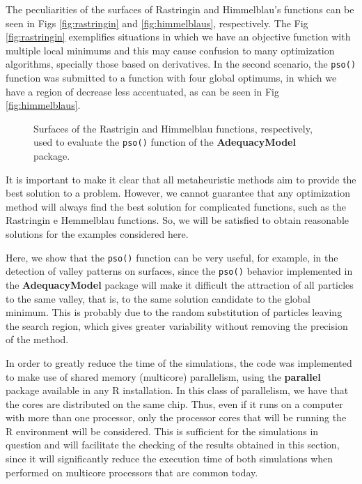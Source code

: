 \documentclass[10pt,letterpaper]{article}
\begin{document}
The peculiarities of the surfaces of Rastringin and Himmelblau's functions can be seen in Figs \ref{fig:rastringin} and \ref{fig:himmelblaus}, respectively. The Fig \ref{fig:rastringin} exemplifies situations in which we have an objective function with multiple local minimums and this may cause confusion to many optimization algorithms, specially those based on derivatives. In the second scenario, the \texttt{pso()} function was submitted to a function with four global optimums, in which we have a region of decrease less accentuated, as can be seen in Fig \ref{fig:himmelblaus}.
\begin{figure}[H]
	\centering
	\subfigure{
		\label{fig:rastringin}
	}
	\subfigure{
		\label{fig:himmelblaus}
	}
	
	\caption{Surfaces of the Rastrigin and Himmelblau functions, respectively, used to evaluate the \texttt{pso()} function of the \textbf{AdequacyModel} package.}
\end{figure}


It is important to make it clear that all metaheuristic methods aim to provide the best solution to a problem. However, we cannot guarantee that any optimization method will always find the best solution for complicated functions, such as the  Rastringin e Hemmelblau functions. So, we will be satisfied to obtain reasonable solutions for the examples considered here.

Here, we show that the \texttt{pso()} function can be very useful, for example, in the detection of valley patterns on surfaces, since the \texttt{pso()} behavior implemented in the \textbf{AdequacyModel} package will make it difficult the attraction of all particles to the same valley, that is, to the same solution candidate to the global minimum. This is probably due to the random substitution of particles leaving the search region, which gives greater variability without removing the precision of the method.
 
In order to greatly reduce the time of the simulations, the code was implemented to make use of shared memory (multicore) parallelism, using the \textbf{parallel} package available in any \textsc{R} installation. In this class of parallelism, we have that the cores are distributed on the same chip. Thus, even if it runs on a computer with more than one processor, only the processor cores that will be running the \textsc{R} environment will be considered. This is sufficient for the simulations in question and will facilitate the checking of the results obtained in this section, since it will significantly reduce the execution time of both simulations when performed on multicore processors that are common today.
  
\end{document}
